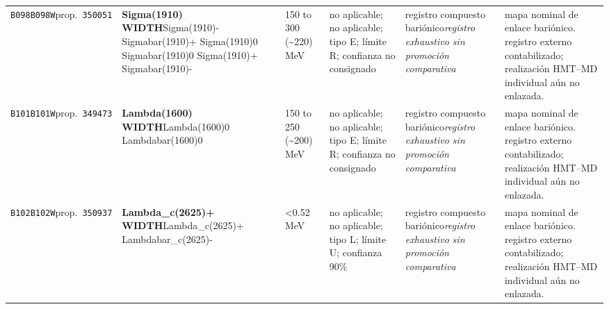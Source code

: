 \begin{landscape}
\begin{longtable}{L{1.85cm}L{4.45cm}L{2.35cm}L{4.05cm}L{3.35cm}L{7.15cm}}
\texttt{B098}\newline \texttt{B098W}\newline prop.\ \texttt{350051} & \textbf{Sigma(1910) WIDTH}\newline Sigma(1910)- \textbar{}\allowbreak{} Sigmabar(1910)+ \textbar{}\allowbreak{} Sigma(1910)0 \textbar{}\allowbreak{} Sigmabar(1910)0 \textbar{}\allowbreak{} Sigma(1910)+ \textbar{}\allowbreak{} Sigmabar(1910)- & 150 to 300 (\textasciitilde{}220)\,MeV & no aplicable; no aplicable; tipo E; límite R; confianza no consignado & registro compuesto bariónico\newline \emph{registro exhaustivo sin promoción comparativa} & mapa nominal de enlace bariónico. registro externo contabilizado; realización HMT--MD individual aún no enlazada. \\
\texttt{B101}\newline \texttt{B101W}\newline prop.\ \texttt{349473} & \textbf{Lambda(1600) WIDTH}\newline Lambda(1600)0 \textbar{}\allowbreak{} Lambdabar(1600)0 & 150 to 250 (\textasciitilde{}200)\,MeV & no aplicable; no aplicable; tipo E; límite R; confianza no consignado & registro compuesto bariónico\newline \emph{registro exhaustivo sin promoción comparativa} & mapa nominal de enlace bariónico. registro externo contabilizado; realización HMT--MD individual aún no enlazada. \\
\texttt{B102}\newline \texttt{B102W}\newline prop.\ \texttt{350937} & \textbf{Lambda\_\allowbreak{}c(2625)+ WIDTH}\newline Lambda\_\allowbreak{}c(2625)+ \textbar{}\allowbreak{} Lambdabar\_\allowbreak{}c(2625)- & \textless{}0.52\,MeV & no aplicable; no aplicable; tipo L; límite U; confianza 90\% & registro compuesto bariónico\newline \emph{registro exhaustivo sin promoción comparativa} & mapa nominal de enlace bariónico. registro externo contabilizado; realización HMT--MD individual aún no enlazada. \\

\end{longtable}
\end{landscape}
